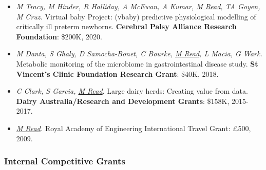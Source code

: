 \documentclass[a4paper]{article}
\begin{document}
\begin{itemize}
\item
\textit{M Tracy, M Hinder, R Halliday, A McEwan, A Kumar, \underline{M Read}, TA Goyen, M Cruz.}
Virtual baby Project: (vbaby) predictive physiological modelling of critically ill preterm newborns.
\textbf{Cerebral Palsy Alliance Research Foundation}: \$200K, 2020.

\item
\textit{M Danta, S Ghaly, D Samocha-Bonet, C Bourke, \underline{M Read}, L Macia, G Wark.}
Metabolic monitoring of the microbiome in gastrointestinal disease study.
\textbf{St Vincent's Clinic Foundation Research Grant}: \$40K, 2018.

\item
\textit{C Clark, S Garcia, \underline{M Read}}.
Large dairy herds: Creating value from data.
\textbf{Dairy Australia/Research and Development Grants}: \$158K, 2015-2017.

\item
\textit{\underline{M Read}.}
Royal Academy of Engineering International Travel Grant: £500, 2009.
\end{itemize}

\subsubsection*{Internal Competitive Grants}
\end{document}
